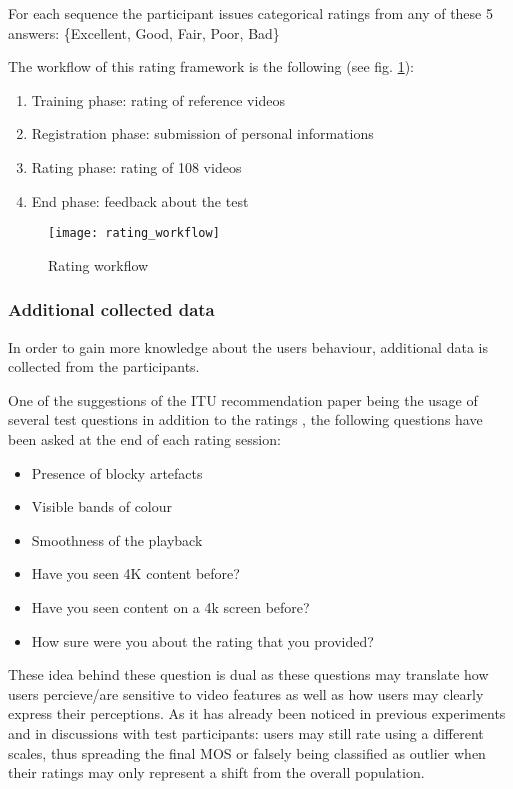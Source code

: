 For each sequence the participant issues categorical ratings from any of these 5 answers: \{Excellent, Good, Fair, Poor, Bad\}


The workflow of this rating framework is the following (see fig. \ref{fig:workflow:state_machine}):
\begin{enumerate}[1]
	\item Training phase: rating of reference videos
	\item Registration phase: submission of personal informations
	\item Rating phase: rating of 108 videos
	\item End phase: feedback about the test
\end{enumerate}

\begin{figure}[h]
	\centering
	\texttt{[image: rating\_workflow]}
	\caption{Rating workflow}
	\label{fig:workflow:state_machine}
\end{figure}

\subsubsection{Additional collected data}
In order to gain more knowledge about the users behaviour, additional data is collected from the participants.

One of the suggestions of the ITU recommendation paper being the usage of several test questions in addition to the ratings \cite{rec1998p}, the following questions have been asked at the end of each rating session:

\begin{itemize}
	\item Presence of blocky artefacts
	\item Visible bands of colour
	\item Smoothness of the playback
	\item Have you seen 4K content before?
	\item Have you seen content on a 4k screen before?
	\item How sure were you about the rating that you provided?
\end{itemize}




These idea behind these question is dual as these questions may translate how users percieve/are sensitive to video features as well as how users may clearly express their perceptions. As it has already been noticed in previous experiments and in discussions with test participants: users may still rate using a different scales, thus spreading the final MOS or falsely being classified as outlier when their ratings may only represent a shift from the overall population. 

